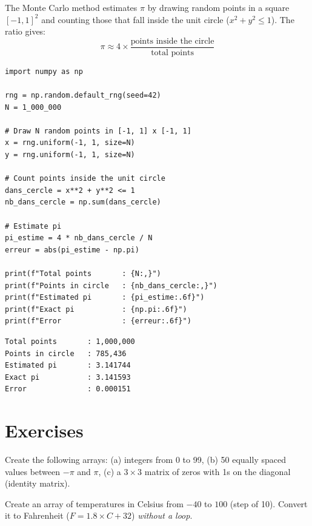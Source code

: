\begin{projet}
The Monte Carlo method estimates $\pi$ by drawing random points
in a square $[-1, 1]^2$ and counting those that fall inside the
unit circle ($x^2 + y^2 \leq 1$). The ratio gives:
\[
    \pi \approx 4 \times \frac{\text{points inside the circle}}{\text{total points}}
\]
\end{projet}

\begin{codeblock}[title=\textbf{Python}]
\begin{verbatim}
import numpy as np

rng = np.random.default_rng(seed=42)
N = 1_000_000

# Draw N random points in [-1, 1] x [-1, 1]
x = rng.uniform(-1, 1, size=N)
y = rng.uniform(-1, 1, size=N)

# Count points inside the unit circle
dans_cercle = x**2 + y**2 <= 1
nb_dans_cercle = np.sum(dans_cercle)

# Estimate pi
pi_estime = 4 * nb_dans_cercle / N
erreur = abs(pi_estime - np.pi)

print(f"Total points       : {N:,}")
print(f"Points in circle   : {nb_dans_cercle:,}")
print(f"Estimated pi       : {pi_estime:.6f}")
print(f"Exact pi           : {np.pi:.6f}")
print(f"Error              : {erreur:.6f}")
\end{verbatim}
\end{codeblock}

\begin{codeoutput}
\begin{verbatim}
Total points       : 1,000,000
Points in circle   : 785,436
Estimated pi       : 3.141744
Exact pi           : 3.141593
Error              : 0.000151
\end{verbatim}
\end{codeoutput}

\section{Exercises}

\begin{exercise}
Create the following arrays: (a) integers from 0 to 99, (b) 50 equally
spaced values between $-\pi$ and $\pi$, (c) a $3\times 3$ matrix of zeros
with 1s on the diagonal (identity matrix).
\end{exercise}

\begin{exercise}
Create an array of temperatures in Celsius from $-40$ to $100$ (step of 10).
Convert it to Fahrenheit ($F = 1.8 \times C + 32$) \emph{without a loop}.
\end{exercise}

